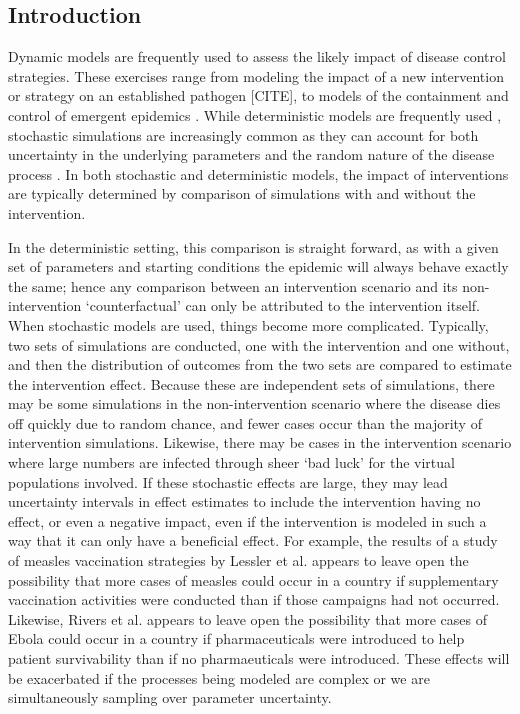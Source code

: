 \documentclass[PTRSB]{rsos}
\begin{document}
\begin{multicols}{2}
\section{Introduction}
Dynamic models are frequently used to assess the likely impact of disease control strategies.
These exercises range from modeling the impact of a new intervention or strategy on an established pathogen [CITE], to models of the containment and control of emergent epidemics \cite{lessler-et-al:2016}.
While deterministic models are frequently used \cite{fraser-et-al:2004}, stochastic simulations are increasingly common as they can account for both uncertainty in the underlying parameters and the random nature of the disease process \cite{ferguson-et-al:2003}.
In both stochastic and deterministic models, the impact of interventions are typically determined by comparison of simulations with and without the intervention.

In the deterministic setting, this comparison is straight forward, as with a given set of parameters and starting conditions the epidemic will always behave exactly the same; hence any comparison between an intervention scenario and its non-intervention ‘counterfactual’ can only be attributed to the intervention itself.
When stochastic models are used, things become more complicated.
Typically, two sets of simulations are conducted, one with the intervention and one without, and then the distribution of outcomes from the two sets are compared to estimate the intervention effect.
Because these are independent sets of simulations, there may be some simulations in the non-intervention scenario where the disease dies off quickly due to random chance, and fewer cases occur than the majority of intervention simulations.
Likewise, there may be cases in the intervention scenario where large numbers are infected through sheer ‘bad luck’ for the virtual populations involved.
If these stochastic effects are large, they may lead uncertainty intervals in effect estimates to include the intervention having no effect, or even a negative impact, even if the intervention is modeled in such a way that it can only have a beneficial effect.
For example, the results of a study of measles vaccination strategies by Lessler et al. appears to leave open the possibility that more cases of measles could occur in a country if supplementary vaccination activities were conducted than if those campaigns had not occurred.
Likewise, Rivers et al. appears to leave open the possibility that more cases of Ebola could occur in a country if pharmaceuticals were introduced to help patient survivability than if no pharmaeuticals were introduced.
These effects will be exacerbated if the processes being modeled are complex or we are simultaneously sampling over parameter uncertainty.


\end{multicols}
\end{document}
